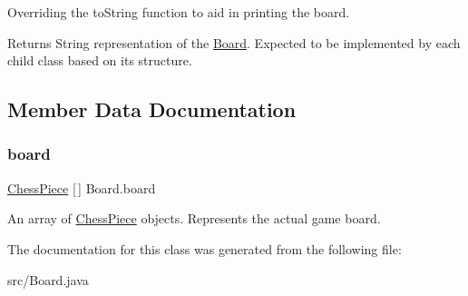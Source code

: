 Overriding the to\+String function to aid in printing the board. \begin{DoxyReturn}{Returns}
String representation of the \mbox{\hyperlink{class_board}{Board}}. Expected to be implemented by each child class based on its structure. 
\end{DoxyReturn}


\subsection{Member Data Documentation}
\mbox{\label{class_board_a50512629d3c28bc8e1bd6278e1955d91}} 
\subsubsection{\texorpdfstring{board}{board}}
{\footnotesize\ttfamily \mbox{\hyperlink{class_chess_piece}{Chess\+Piece}} \mbox{[}$\,$\mbox{]} Board.\+board\hspace{0.3cm}{\ttfamily [protected]}}

An array of \mbox{\hyperlink{class_chess_piece}{Chess\+Piece}} objects. Represents the actual game board. 

The documentation for this class was generated from the following file\+:\begin{DoxyCompactItemize}
\item 
src/Board.\+java\end{DoxyCompactItemize}
